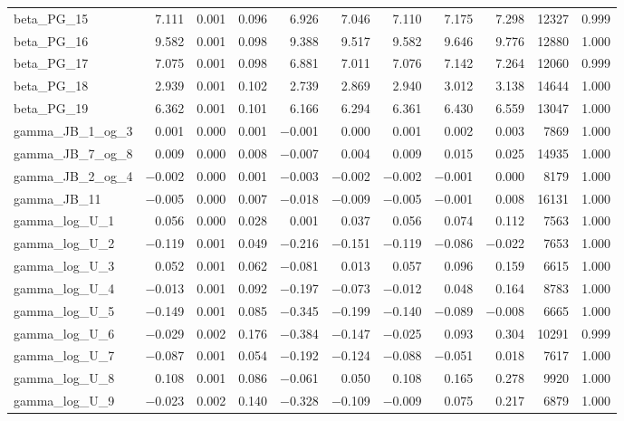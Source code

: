 \documentclass[12pt]{article}
\begin{document}
\begin{longtable}{lrrrrrrrrrr}
beta\_PG\_15 & 7.111 & 0.001 & 0.096 & 6.926 & 7.046 & 7.110 & 7.175 & 7.298 & 12327 & 0.999 \\
beta\_PG\_16 & 9.582 & 0.001 & 0.098 & 9.388 & 9.517 & 9.582 & 9.646 & 9.776 & 12880 & 1.000 \\
beta\_PG\_17 & 7.075 & 0.001 & 0.098 & 6.881 & 7.011 & 7.076 & 7.142 & 7.264 & 12060 & 0.999 \\
beta\_PG\_18 & 2.939 & 0.001 & 0.102 & 2.739 & 2.869 & 2.940 & 3.012 & 3.138 & 14644 & 1.000 \\
beta\_PG\_19 & 6.362 & 0.001 & 0.101 & 6.166 & 6.294 & 6.361 & 6.430 & 6.559 & 13047 & 1.000 \\
\addlinespace
gamma\_JB\_1\_og\_3  & 0.001 & 0.000 & 0.001 & $-$0.001 & 0.000 & 0.001 & 0.002 & 0.003 & 7869 & 1.000 \\
gamma\_JB\_7\_og\_8  & 0.009 & 0.000 & 0.008 & $-$0.007 & 0.004 & 0.009 & 0.015 & 0.025 & 14935 & 1.000 \\
gamma\_JB\_2\_og\_4  & $-$0.002 & 0.000 & 0.001 & $-$0.003 & $-$0.002 & $-$0.002 & $-$0.001 & 0.000 & 8179 & 1.000 \\
gamma\_JB\_11       & $-$0.005 & 0.000 & 0.007 & $-$0.018 & $-$0.009 & $-$0.005 & $-$0.001 & 0.008 & 16131 & 1.000 \\
gamma\_log\_U\_1  &  0.056 & 0.000 & 0.028 &  0.001 &  0.037 &  0.056 &  0.074 &  0.112 & 7563 & 1.000 \\
gamma\_log\_U\_2  & $-$0.119 & 0.001 & 0.049 & $-$0.216 & $-$0.151 & $-$0.119 & $-$0.086 & $-$0.022 & 7653 & 1.000 \\
gamma\_log\_U\_3  &  0.052 & 0.001 & 0.062 & $-$0.081 &  0.013 &  0.057 &  0.096 &  0.159 & 6615 & 1.000 \\
gamma\_log\_U\_4  & $-$0.013 & 0.001 & 0.092 & $-$0.197 & $-$0.073 & $-$0.012 &  0.048 &  0.164 & 8783 & 1.000 \\
gamma\_log\_U\_5  & $-$0.149 & 0.001 & 0.085 & $-$0.345 & $-$0.199 & $-$0.140 & $-$0.089 & $-$0.008 & 6665 & 1.000 \\
gamma\_log\_U\_6  & $-$0.029 & 0.002 & 0.176 & $-$0.384 & $-$0.147 & $-$0.025 &  0.093 &  0.304 & 10291 & 0.999 \\
gamma\_log\_U\_7  & $-$0.087 & 0.001 & 0.054 & $-$0.192 & $-$0.124 & $-$0.088 & $-$0.051 &  0.018 & 7617 & 1.000 \\
gamma\_log\_U\_8  &  0.108 & 0.001 & 0.086 & $-$0.061 &  0.050 &  0.108 &  0.165 &  0.278 & 9920 & 1.000 \\
gamma\_log\_U\_9  & $-$0.023 & 0.002 & 0.140 & $-$0.328 & $-$0.109 & $-$0.009 &  0.075 &  0.217 & 6879 & 1.000 \\

\end{longtable}
\end{document}
